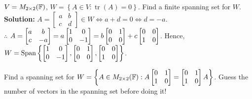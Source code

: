 \begin{example}
    $V = M_{2 \times 2}({\mathbb{F}})$, $W = \left\{  A \in V: \operatorname{tr}{(A)} = 0 \right\}$. Find a finite spanning set for $W$. \vspace{1mm} \\
    \textbf{Solution: } $A =
    \begin{bmatrix}
        a & b \\
        c & d
    \end{bmatrix} \in W \iff a + d = 0 \iff d = -a.$ \vspace{1mm} \\
    $\therefore$ $A =
    \begin{bmatrix}
        a & b \\
        c & -a
    \end{bmatrix} = a \begin{bmatrix} 1 & 0 \\ 0 & -1 \end{bmatrix} = b \begin{bmatrix} 0 & 1 \\ 0 & 0 \end{bmatrix} + c \begin{bmatrix} 0 & 0 \\ 1 & 0 \end{bmatrix}$.
    Hence, $W = \operatorname{Span}{\left\{\begin{bmatrix} 1 & 0 \\ 0 & -1 \end{bmatrix}, \begin{bmatrix} 0 & 1 \\ 0 & 0 \end{bmatrix}, \begin{bmatrix} 0 & 0 \\ 1 & 0 \end{bmatrix}\right\}}$.
\end{example}

\begin{example}
    Find a spanning set for $W = \left\{  A \in M_{2 \times 2}({\mathbb{F}}): A
    \begin{bmatrix}
        0 & 1 \\
        1 & 0
    \end{bmatrix} = 
    \begin{bmatrix}
        0 & 1 \\
        1 & 0
    \end{bmatrix} A
    \right\}$. Guess the number of vectors in the spanning set before doing it!
\end{example}



